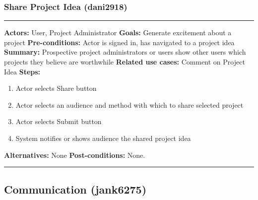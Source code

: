 \documentclass[11pt]{report}
\begin{document}
\subsubsection{Share Project Idea (dani2918)}
\vspace{2pt}
\hrule
\vspace{8pt}
 \textbf{Actors:} User, Project Administrator \newline
\textbf{Goals:} Generate excitement about a project  \newline
 \textbf{Pre-conditions:} Actor is signed in, has navigated to a project idea  \newline
 \textbf{Summary:}  Prospective project administrators or users show other users which projects they believe are worthwhile \newline
\textbf{Related use cases:} Comment on Project Idea \newline
\textbf{Steps:} \begin{enumerate}
  \item Actor selects Share button
  \item Actor selects an audience and method with which to share selected project
  \item Actor selects Submit button
  \item System notifies or shows audience the shared project idea
 \end{enumerate}
 \textbf{Alternatives:} None \newline
 \textbf{Post-conditions:} None. \newline
\vspace{8pt}
\hrule
\newpage

\subsection{Communication (jank6275)}
\end{document}
